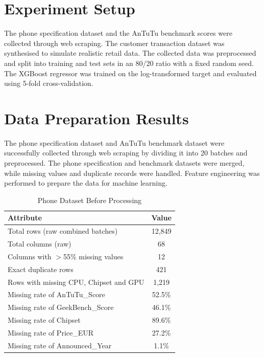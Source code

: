 \documentclass[12pt]{report}
\numberwithin{figure}{chapter}
\numberwithin{table}{chapter}
\numberwithin{equation}{chapter}
\begin{document}
\section{Experiment Setup}

The phone specification dataset and the AnTuTu benchmark scores were collected through web scraping. The customer transaction dataset was synthesised to simulate realistic retail data. The collected data was preprocessed and split into training and test sets in an 80/20 ratio with a fixed random seed. The XGBoost regressor was trained on the log-transformed target and evaluated using 5-fold cross-validation.

\section{Data Preparation Results}

The phone specification dataset and AnTuTu benchmark dataset were successfully collected through web scraping by dividing it into 20 batches and preprocessed. The phone specification and benchmark datasets were merged, while missing values and duplicate records were handled. Feature engineering was performed to prepare the data for machine learning.

\begin{table}[H]
\centering
\caption{Phone Dataset Before Processing}
\label{tab:before-processing}
\begin{tabular}{|l|c|}
\hline
\textbf{Attribute} & \textbf{Value} \\
\hline
Total rows (raw combined batches) & 12,849 \\
\hline
Total columns (raw) & 68 \\
\hline
Columns with $>$55\% missing values & 12 \\
\hline
Exact duplicate rows & 421 \\
\hline
Rows with missing CPU, Chipset and GPU & 1,219 \\
\hline
Missing rate of AnTuTu\_Score & 52.5\% \\
\hline
Missing rate of GeekBench\_Score & 46.1\% \\
\hline
Missing rate of Chipset & 89.6\% \\
\hline
Missing rate of Price\_EUR & 27.2\% \\
\hline
Missing rate of Announced\_Year & 1.1\% \\
\hline
\end{tabular}
\end{table}
\end{document}
